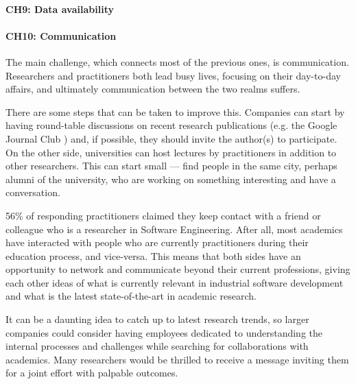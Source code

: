 \paragraph{CH9: Data availability}

\paragraph{CH10: Communication}
The main challenge, which connects most of the previous ones, is communication.
Researchers and practitioners both lead busy lives, focusing on their day-to-day affairs, and ultimately communication between the two realms suffers.

There are some steps that can be taken to improve this.
Companies can start by having round-table discussions on recent research publications (e.g. the Google Journal Club \cite{googlejournal}) and, if possible, they should invite the author(s) to participate.
On the other side, universities can host lectures by practitioners in addition to other researchers.
This can start small — find people in the same city, perhaps alumni of the university, who are working on something interesting and have a conversation.

56\% of responding practitioners claimed they keep contact with a friend or colleague who is a researcher in Software Engineering.
After all, most academics have interacted with people who are currently practitioners during their education process, and vice-versa.
This means that both sides have an opportunity to network and communicate beyond their current professions, giving each other ideas of what is currently relevant in industrial software development and what is the latest state-of-the-art in academic research.

It can be a daunting idea to catch up to latest research trends, so larger companies could consider having employees dedicated to understanding the internal processes and challenges while searching for collaborations with academics.
Many researchers would be thrilled to receive a message inviting them for a joint effort with palpable outcomes.